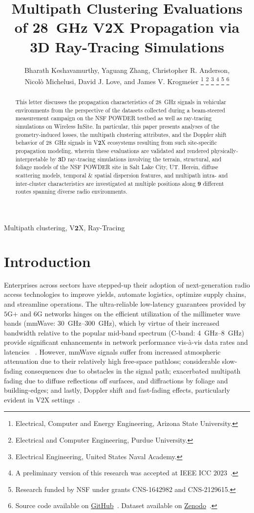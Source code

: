 \documentclass[10pt, twocolumn]{IEEEtran}
\title{Multipath Clustering Evaluations of \SI{28}{\giga\hertz} V2X Propagation via 3D Ray-Tracing Simulations}
\author{Bharath Keshavamurthy\IEEEauthorrefmark{1}, Yaguang Zhang\IEEEauthorrefmark{2}, Christopher R. Anderson\IEEEauthorrefmark{3},\\Nicol\`{o} Michelusi\IEEEauthorrefmark{1}, David J. Love\IEEEauthorrefmark{2}, and James V. Krogmeier\IEEEauthorrefmark{2}
\thanks{\IEEEauthorrefmark{1}Electrical, Computer and Energy Engineering, Arizona State University.}
\thanks{\IEEEauthorrefmark{2}Electrical and Computer Engineering, Purdue University.}
\thanks{\IEEEauthorrefmark{3}Electrical Engineering, United States Naval Academy.}
\thanks{A preliminary version of this research was accepted at IEEE ICC $2023$~\cite{SPAVE_ICC}.}
\thanks{Research funded by NSF under grants CNS-1642982 and CNS-2129615.}
\thanks{Source code available on \href{https://github.com/bharathkeshavamurthy/SPAVE-28G}{GitHub}~\cite{SPAVE_Source_Code}. Dataset available on \href{https://doi.org/10.5281/zenodo.7178597}{Zenodo}~\cite{SPAVE_Dataset}.}
\vspace{-12mm}
}
\begin{document}

\maketitle
\thispagestyle{empty}
\pagestyle{empty}
\vspace{-12mm}

\begin{abstract}
This letter discusses the propagation characteristics of \SI{28}{\giga\hertz} signals in vehicular environments from the perspective of the datasets collected during a beam-steered measurement campaign on the NSF POWDER testbed as well as ray-tracing simulations on Wireless InSite. In particular, this paper presents analyses of the geometry-induced losses, the multipath clustering attributes, and the Doppler shift behavior of \SI{28}{\giga\hertz} signals in V$\mathbf{2}$X ecosystems resulting from such site-specific propagation modeling, wherein these evaluations are validated and rendered physically-interpretable by $\mathbf{3}$D ray-tracing simulations involving the terrain, structural, and foliage models of the NSF POWDER site in Salt Lake City, UT. Herein, diffuse scattering models, temporal \& spatial dispersion features, and multipath intra- and inter-cluster characteristics are investigated at multiple positions along $\mathbf{9}$ different routes spanning diverse radio environments.
\end{abstract}

\begin{IEEEkeywords}
    Multipath clustering, V$\mathbf{2}$X, Ray-Tracing
\end{IEEEkeywords}
\vspace{-3mm}

\section{Introduction}\label{S1}
Enterprises across sectors have stepped-up their adoption of next-generation radio access technologies to improve yields, automate logistics, optimize supply chains, and streamline operations. The ultra-reliable low-latency guarantees provided by $5$G$+$ and $6$G networks hinges on the efficient utilization of the millimeter wave bands (mmWave: \SIrange{30}{300}{\giga\hertz}), which by virtue of their increased bandwidth relative to the popular mid-band spectrum (C-band: \SIrange{4}{8}{\giga\hertz}) provide significant enhancements in network performance vis-\`{a}-vis data rates and latencies ~\cite{mmWaveSurvey}. However, mmWave signals suffer from increased atmospheric attenuation due to their relatively high free-space pathloss; considerable slow-fading consequences due to obstacles in the signal path; exacerbated multipath fading due to diffuse reflections off surfaces, and diffractions by foliage and building-edges; and lastly, Doppler shift and fast-fading effects, particularly evident in V$2$X settings~\cite{Rappaport}.
\end{document}
